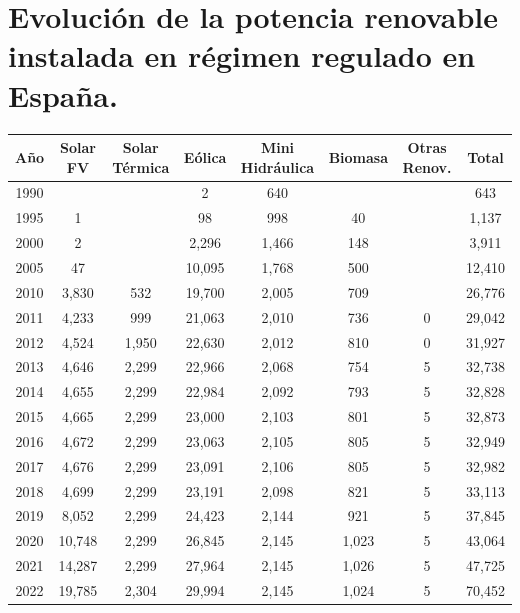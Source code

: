 \section{Evolución de la potencia renovable instalada en régimen regulado en España.}
	\begin{table}[H]
		\centering
		\begin{tabular}{cccccccc}
			\toprule
   Año & Solar FV & Solar Térmica & Eólica & Mini Hidráulica & Biomasa & Otras Renov. & Total \\
			\midrule
			1990 & & & 2 & 640 & & & 643 \\
			1995 & 1 & & 98 & 998 & 40 & & 1,137 \\
			2000 & 2 & & 2,296 & 1,466 & 148 & & 3,911 \\
			2005 & 47 & & 10,095 & 1,768 & 500 & & 12,410 \\
			2010 & 3,830 & 532 & 19,700 & 2,005 & 709 & & 26,776 \\
			2011 & 4,233 & 999 & 21,063 & 2,010 & 736 & 0 & 29,042 \\
			2012 & 4,524 & 1,950 & 22,630 & 2,012 & 810 & 0 & 31,927 \\
			2013 & 4,646 & 2,299 & 22,966 & 2,068 & 754 & 5 & 32,738 \\
			2014 & 4,655 & 2,299 & 22,984 & 2,092 & 793 & 5 & 32,828 \\
			2015 & 4,665 & 2,299 & 23,000 & 2,103 & 801 & 5 & 32,873 \\
			2016 & 4,672 & 2,299 & 23,063 & 2,105 & 805 & 5 & 32,949 \\
			2017 & 4,676 & 2,299 & 23,091 & 2,106 & 805 & 5 & 32,982 \\
			2018 & 4,699 & 2,299 & 23,191 & 2,098 & 821 & 5 & 33,113 \\
			2019 & 8,052 & 2,299 & 24,423 & 2,144 & 921 & 5 & 37,845 \\
			2020 & 10,748 & 2,299 & 26,845 & 2,145 & 1,023 & 5 & 43,064 \\
			2021 & 14,287 & 2,299 & 27,964 & 2,145 & 1,026 & 5 & 47,725 \\
			2022 & 19,785 & 2,304 & 29,994 & 2,145 & 1,024 & 5 & 70,452 \\
		\end{tabular}
	\end{table}

